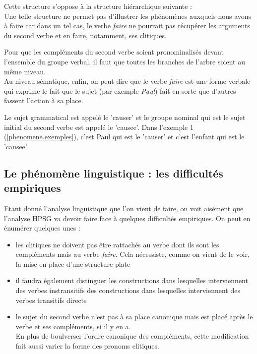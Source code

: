 
Cette structure s'oppose à la structure hiérarchique suivante :\\


Une telle structure ne permet pas d'illustrer les phénomènes auxquels nous avons à faire car dans un tel cas, le verbe \emph{faire} ne pourrait pas récupérer les arguments du second verbe et en faire, notamment, ses clitiques.

Pour que les compléments du second verbe soient pronominalisés devant l'ensemble du groupe verbal, il faut que toutes les branches de l'arbre soient au même niveau.\\

Au niveau sématique, enfin, on peut dire que le verbe \emph{faire} est une forme verbale qui exprime le fait que le sujet (par exemple \emph{Paul}) fait en sorte que d'autres fassent l'action à sa place.

Le sujet grammatical est appelé le 'causer' et le groupe nominal qui est le sujet initial du second verbe est appelé le 'causee'.
Dans l'exemple 1 (\autoref{phenomene.exemples}), c'est Paul qui est le 'causer' et c'est l'enfant qui est le 'causee'.

\newpage

\subsection{Le phénomène linguistique : les difficultés empiriques}

Etant donné l'analyse linguistique que l'on vient de faire, on voit aisément que l'analyse HPSG va devoir faire face à quelques difficultés empiriques.
On peut en énumérer quelques unes :\\

\begin{itemize}
  \item les clitiques ne doivent pas être rattachés au verbe dont ils sont les compléments mais au verbe \emph{faire}.
    Cela nécessiste, comme on vient de le voir, la mise en place d'une structure plate
  \item il faudra également distinguer les constructions dans lesquelles interviennent des verbes instransitifs des constructions dans lesquelles interviennent des verbes transitifs directs
  \item le sujet du second verbe n'est pas à sa place canonique mais est placé après le verbe et ses compléments, si il y en a.\\
    En plus de boulverser l'ordre canonique des compléments, cette modification fait aussi varier la forme des pronoms clitiques.
\end{itemize}

